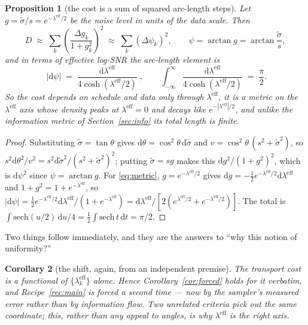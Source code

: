 \documentclass[11pt]{article}
\newtheorem{proposition}{Proposition}
\newtheorem{corollary}[proposition]{Corollary}
\theoremstyle{definition}
\newcommand{\sig}{\tilde\sigma}
\newcommand{\dd}{\mathrm{d}}
\newcommand{\leff}{\lambda^{\mathrm{eff}}}
\begin{document}
\begin{proposition}[the cost is a sum of squared arc-length steps]
\label{prop:metric}
Let $g=\sig/s=e^{-\leff/2}$ be the noise level in units of the data scale. Then
\begin{equation}
  D \;\approx\; \sum_k\left(\frac{\Delta g_k}{1+g_k^2}\right)^{\!2}
    \;\approx\; \sum_k (\Delta\psi_k)^2,
  \qquad
  \psi=\arctan g=\arctan\frac{\sig}{s},
  \label{eq:sumsq}
\end{equation}
and in terms of effective log-SNR the arc-length element is
\begin{equation}
  \boxed{\;
  |\dd\psi| \;=\; \frac{\dd\leff}{4\cosh(\leff/2)}\;},
  \qquad
  \int_{-\infty}^{\infty}\frac{\dd\leff}{4\cosh(\leff/2)} \;=\; \frac{\pi}{2}.
  \label{eq:metric}
\end{equation}
So the cost depends on schedule and data only through $\leff$, it is a
\emph{metric} on the $\leff$ axis whose density peaks at $\leff=0$ and decays
like $e^{-|\leff|/2}$, and unlike the information metric of
Section~\ref{sec:info} its total length is \emph{finite}.
\end{proposition}

\begin{proof}
Substituting $\sig=\tan\theta$ gives $\dd\theta=\cos^2\!\theta\,\dd\sig$ and
$v=\cos^2\!\theta\,(s^2+\sig^2)$, so
$s^2\dd\theta^2/v^2=s^2\dd\sig^2/(s^2+\sig^2)^2$; putting $\sig=sg$ makes this
$\dd g^2/(1+g^2)^2$, which is $\dd\psi^2$ since $\psi=\arctan g$. For
\eqref{eq:metric}, $g=e^{-\leff/2}$ gives
$\dd g=-\tfrac12e^{-\leff/2}\dd\leff$ and
$1+g^2=1+e^{-\leff}$, so
$|\dd\psi|=\tfrac12 e^{-\leff/2}\dd\leff/(1+e^{-\leff})
=\dd\leff/[2(e^{\leff/2}+e^{-\leff/2})]$. The total is
$\int\mathrm{sech}(u/2)\,\dd u/4=\tfrac12\int\mathrm{sech}\,t\,\dd t=\pi/2$.
\end{proof}

Two things follow immediately, and they are the answers to ``why this notion of
uniformity?''

\begin{corollary}[the shift, again, from an independent premise]
\label{cor:forced2}
The transport cost is a functional of $\{\leff_k\}$ alone. Hence
Corollary~\ref{cor:forced} holds for it verbatim, and Recipe~\ref{rec:main} is
forced a second time --- now by the sampler's measured error rather than by
information flow. \emph{Two unrelated criteria pick out the same coordinate};
this, rather than any appeal to angles, is why $\leff$ is the right axis.
\end{corollary}
\end{document}
